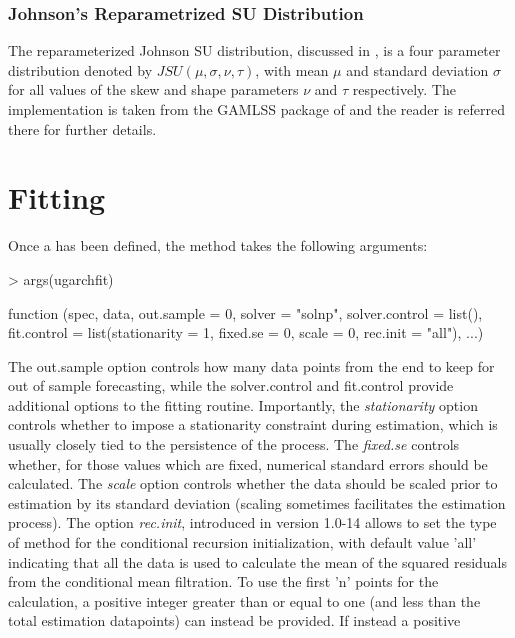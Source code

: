 \subsubsection{Johnson's Reparametrized SU Distribution}\label{jsu}
The reparameterized Johnson SU distribution, discussed in \cite{Rigby2005}, is a
four parameter distribution denoted by $JSU\left(\mu,\sigma,\nu,\tau\right)$,
with mean $\mu$ and standard deviation $\sigma$ for all values of the skew and
shape parameters $\nu$ and $\tau$ respectively. The implementation is taken
from the GAMLSS package of \cite{Stasinopoulos2009} and the reader is referred
there for further details.

\section{Fitting}\label{section:fitting}
Once a \verb@uGARCHspec@ has been defined, the \verb@ugarchfit@ method takes
the following arguments:
\begin{Schunk}
\begin{Sinput}
> args(ugarchfit)
\end{Sinput}
\begin{Soutput}
function (spec, data, out.sample = 0, solver = "solnp", solver.control = list(),
    fit.control = list(stationarity = 1, fixed.se = 0, scale = 0,
        rec.init = "all"), ...)
\end{Soutput}
\end{Schunk}
The out.sample option controls how many data points from the end to keep for out
of sample forecasting, while the solver.control and fit.control provide additional
options to the fitting routine. Importantly, the \emph{stationarity} option controls
whether to impose a stationarity constraint during estimation, which is usually
closely tied to the persistence of the process. The \emph{fixed.se} controls
whether, for those values which are fixed, numerical standard errors should be
calculated. The \emph{scale} option controls whether the data should be scaled prior
to estimation by its standard deviation (scaling sometimes facilitates the estimation
process). The option \emph{rec.init}, introduced in version 1.0-14 allows to set
the type of method for the conditional recursion initialization, with default
value 'all' indicating that all the data is used to calculate the mean of the
squared residuals from the conditional mean filtration. To use the first 'n' points
for the calculation, a positive integer greater than or equal to one (and less than
the total estimation datapoints) can instead be provided. If instead a positive

